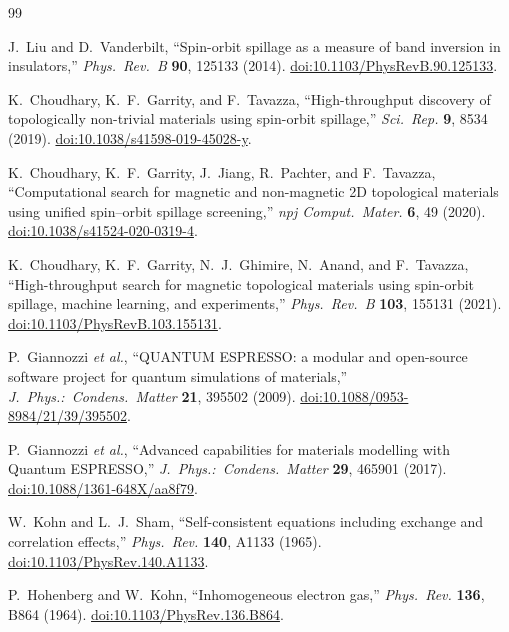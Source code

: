 \documentclass[11pt]{article}
\begin{document}
\begin{thebibliography}{99}

J.~Liu and D.~Vanderbilt,
``Spin-orbit spillage as a measure of band inversion in insulators,''
\textit{Phys.\ Rev.\ B} \textbf{90}, 125133 (2014).
\href{https://doi.org/10.1103/PhysRevB.90.125133}{doi:10.1103/PhysRevB.90.125133}.

K.~Choudhary, K.~F.~Garrity, and F.~Tavazza,
``High-throughput discovery of topologically non-trivial materials using spin-orbit
spillage,''
\textit{Sci.\ Rep.} \textbf{9}, 8534 (2019).
\href{https://doi.org/10.1038/s41598-019-45028-y}{doi:10.1038/s41598-019-45028-y}.

K.~Choudhary, K.~F.~Garrity, J.~Jiang, R.~Pachter, and F.~Tavazza,
``Computational search for magnetic and non-magnetic 2D topological materials using
unified spin--orbit spillage screening,''
\textit{npj Comput.\ Mater.} \textbf{6}, 49 (2020).
\href{https://doi.org/10.1038/s41524-020-0319-4}{doi:10.1038/s41524-020-0319-4}.

K.~Choudhary, K.~F.~Garrity, N.~J.~Ghimire, N.~Anand, and F.~Tavazza,
``High-throughput search for magnetic topological materials using spin-orbit spillage,
machine learning, and experiments,''
\textit{Phys.\ Rev.\ B} \textbf{103}, 155131 (2021).
\href{https://doi.org/10.1103/PhysRevB.103.155131}{doi:10.1103/PhysRevB.103.155131}.

P.~Giannozzi \textit{et al.},
``QUANTUM ESPRESSO: a modular and open-source software project for quantum simulations
of materials,''
\textit{J.\ Phys.:\ Condens.\ Matter} \textbf{21}, 395502 (2009).
\href{https://doi.org/10.1088/0953-8984/21/39/395502}{doi:10.1088/0953-8984/21/39/395502}.

P.~Giannozzi \textit{et al.},
``Advanced capabilities for materials modelling with Quantum ESPRESSO,''
\textit{J.\ Phys.:\ Condens.\ Matter} \textbf{29}, 465901 (2017).
\href{https://doi.org/10.1088/1361-648X/aa8f79}{doi:10.1088/1361-648X/aa8f79}.

W.~Kohn and L.~J.~Sham,
``Self-consistent equations including exchange and correlation effects,''
\textit{Phys.\ Rev.} \textbf{140}, A1133 (1965).
\href{https://doi.org/10.1103/PhysRev.140.A1133}{doi:10.1103/PhysRev.140.A1133}.

P.~Hohenberg and W.~Kohn,
``Inhomogeneous electron gas,''
\textit{Phys.\ Rev.} \textbf{136}, B864 (1964).
\href{https://doi.org/10.1103/PhysRev.136.B864}{doi:10.1103/PhysRev.136.B864}.


\end{thebibliography}
\end{document}
